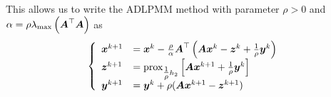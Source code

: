 This allows us to write the ADLPMM method with parameter $\rho>0$ and $\alpha = \rho \lambda_{\text{max}}\left(\boldsymbol A^\top \boldsymbol A\right)$ as 
      \begin{align*}
    \begin{split}
    \left\{
    \begin{array}{ll}
         \boldsymbol x^{k+1} &= \boldsymbol x^k - \frac{\rho}{\alpha} \boldsymbol A^\top \left(\boldsymbol A\boldsymbol x^k-\boldsymbol z^k + {\textstyle\frac{1}{\rho}} \boldsymbol y^k\right)\\
        \boldsymbol z^{k+1} &= \operatorname{prox}_{{\textstyle\frac{1}{\rho}} h_2}\left[\boldsymbol A \boldsymbol x^{k+1} + {\textstyle\frac{1}{\rho}} \boldsymbol y^k \right]\\
        \boldsymbol y^{k+1} &= \boldsymbol y^{k} + \rho (\boldsymbol A \boldsymbol x^{k+1}- \boldsymbol z^{k+1})
    \end{array}
    \right.
    \end{split}
    \end{align*}
    

